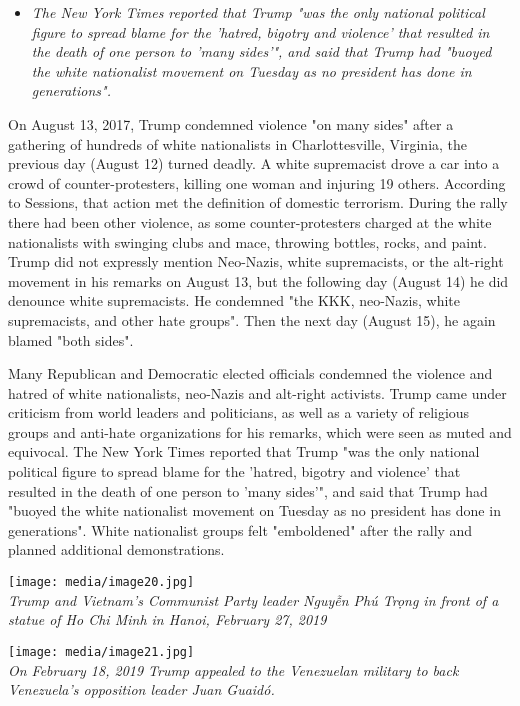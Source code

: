 \begin{itemize}
\item
  \emph{The New York Times reported that Trump "was the only national
  political figure to spread blame for the 'hatred, bigotry and
  violence' that resulted in the death of one person to 'many sides'",
  and said that Trump had "buoyed the white nationalist movement on
  Tuesday as no president has done in generations".}
\end{itemize}

On August 13, 2017, Trump condemned violence "on many sides" after a
gathering of hundreds of white nationalists in Charlottesville,
Virginia, the previous day (August 12) turned deadly. A white
supremacist drove a car into a crowd of counter-protesters, killing one
woman and injuring 19 others. According to Sessions, that action met the
definition of domestic terrorism. During the rally there had been other
violence, as some counter-protesters charged at the white nationalists
with swinging clubs and mace, throwing bottles, rocks, and paint. Trump
did not expressly mention Neo-Nazis, white supremacists, or the
alt-right movement in his remarks on August 13, but the following day
(August 14) he did denounce white supremacists. He condemned "the KKK,
neo-Nazis, white supremacists, and other hate groups". Then the next day
(August 15), he again blamed "both sides".

Many Republican and Democratic elected officials condemned the violence
and hatred of white nationalists, neo-Nazis and alt-right activists.
Trump came under criticism from world leaders and politicians, as well
as a variety of religious groups and anti-hate organizations for his
remarks, which were seen as muted and equivocal. The New York Times
reported that Trump "was the only national political figure to spread
blame for the 'hatred, bigotry and violence' that resulted in the death
of one person to 'many sides'", and said that Trump had "buoyed the
white nationalist movement on Tuesday as no president has done in
generations". White nationalist groups felt "emboldened" after the rally
and planned additional demonstrations.

\texttt{[image: media/image20.jpg]}\\
\emph{Trump and Vietnam's Communist Party leader Nguyễn Phú Trọng in
front of a statue of Ho Chi Minh in Hanoi, February 27, 2019}

\texttt{[image: media/image21.jpg]}\\
\emph{On February 18, 2019 Trump appealed to the Venezuelan military to
back Venezuela's opposition leader Juan Guaidó.}

